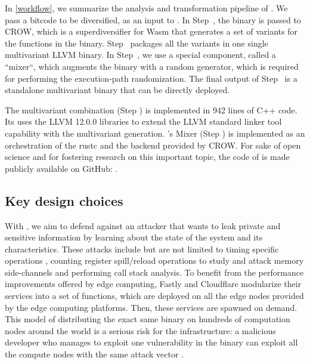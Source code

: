 In \autoref{workflow}, we summarize the analysis and transformation pipeline of \tool.
We pass a bitcode to be diversified, as an input to \tool.
In Step~, the binary is passed to CROW, which is a superdiversifier for Wasm that generates a set of  variants for the functions in the binary. 
Step~ packages all the variants in one single multivariant LLVM binary. 
In Step~, we use a special component, called a ``mixer``,  which augments the binary with a random generator, which is required for performing the execution-path randomization. 
The final output of Step~ is a standalone multivariant \wasm binary that can be directly deployed. 

The multivariant combination (Step ) is implemented in 942 lines of C++ code.
Its uses the LLVM 12.0.0 libraries to extend the LLVM standard linker tool capability with the multivariant generation.
\tool's Mixer (Step ) is implemented as an orchestration of the rustc and the \wasm backend provided by CROW.
For sake of open science and for fostering research on this important topic, the code of \tool is made publicly available on GitHub: \repourl.

\subsection*{Key design choices}
\label{sec:design}

With \tool, we aim to defend against an attacker that wants to leak private and sensitive information by learning about the state of the system and its characteristics.
These attacks include but are not limited to timing specific operations \cite{bernstein2005cache,aciiccmez2007cache}, counting register spill/reload operations to study and attack memory side-channels \cite{rane2015raccoon} and performing call stack analysis.
To benefit from the performance improvements offered by edge computing,  Fastly and Cloudflare modularize their services into a set of \wasm functions, which are deployed on all the edge nodes provided by the edge computing platforms. Then, these services are spawned on demand. This model of distributing the exact same \wasm binary on hundreds of computation nodes around the world is a serious risk for the infrastructure: a malicious developer who manages to exploit one vulnerability in the binary can exploit all the compute nodes with the same attack vector \cite{o2004achieving}.



